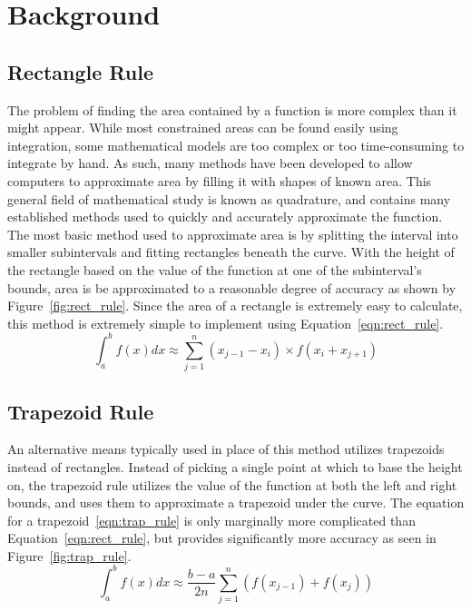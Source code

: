 \documentclass{paper}
\begin{document}
\thispagestyle{empty}
\insertTitlePage
\thispagestyle{empty}
\tableofcontents
\newpage
\setcounter{page}{1}

\section{Background}
\subsection{Rectangle Rule}
The problem of finding the area contained by a function is more complex than it might appear.
While most constrained areas can be found easily using integration, some mathematical models are too complex or too time-consuming to integrate by hand.
As such, many methods have been developed to allow computers to approximate area by filling it with shapes of known area.
This general field of mathematical study is known as quadrature, and contains many established methods used to quickly and accurately approximate the function.
The most basic method used to approximate area is by splitting the interval into smaller subintervals and fitting rectangles beneath the curve.
With the height of the rectangle based on the value of the function at one of the subinterval's bounds, area is be approximated to a reasonable degree of accuracy as shown by Figure~\ref{fig:rect_rule}.
Since the area of a rectangle is extremely easy to calculate, this method is extremely simple to implement using Equation~\ref{eqn:rect_rule}.
%
\begin{equation}
    \label{eqn:rect_rule}
    \int_a^b f(x) dx \approx \sum_{j=1}^n (x_{j-1} - x_i) \times f(x_i + x_{j+1})
\end{equation}
%

%
\subsection{Trapezoid Rule}
An alternative means typically used in place of this method utilizes trapezoids instead of rectangles.
Instead of picking a single point at which to base the height on, the trapezoid rule utilizes the value of the function at both the left and right bounds, and uses them to approximate a trapezoid under the curve.
The equation for a trapezoid~\eqref{eqn:trap_rule} is only marginally more complicated than Equation~\ref{eqn:rect_rule}, but provides significantly more accuracy as seen in Figure~\ref{fig:trap_rule}.
%
\begin{equation}
    \label{eqn:trap_rule}
    \int_a^b f(x) dx \approx \dfrac{b - a}{2n} \sum_{j=1}^n (f(x_{j-1})+f(x_{j}))
\end{equation}
%

%
\end{document}
